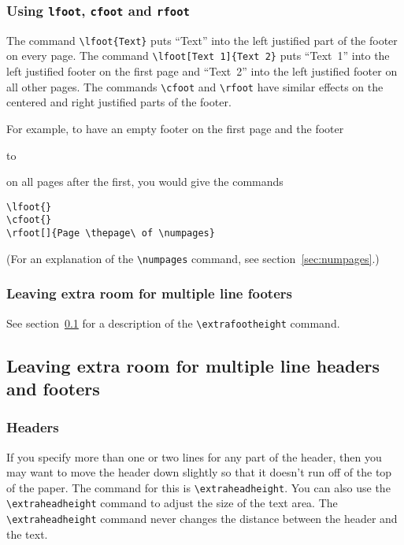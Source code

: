 \documentclass[12pt]{exam}
\def\samplefoot#1#2#3#4{%
  \begin{trivlist}
     \item[]
     \leavevmode
     #1
     \vskip 3pt

     \hbox to \textwidth{%
         \rlap{\parbox[t]{\textwidth}{\raggedright#2}}%
         \hfil\parbox[t]{\textwidth}{\centering#3}\hfil
         \llap{\parbox[t]{\textwidth}{\raggedleft#4}}%
  }%
  \end{trivlist}
}
\begin{document}
\subsubsection{Using \texttt{lfoot}, \texttt{cfoot} and \texttt{rfoot}}
\label{sec:lfoot}

The command \verb"\lfoot{Text}" puts ``Text'' into the left justified
part of the footer on every page.  The command
\verb"\lfoot[Text 1]{Text 2}" puts ``Text~1'' into the left justified
footer on the first page and ``Text~2'' into the left justified footer
on all other pages.  The commands \verb"\cfoot" and \verb"\rfoot" have
similar effects on the centered and right justified parts of the
footer. 


For example, to have an empty footer on the first page and the footer
\samplefoot{}{}{Page 3 of 5}{}
on all pages after the first, you would give the commands
%
\begin{verbatim}
\lfoot{}
\cfoot{}
\rfoot[]{Page \thepage\ of \numpages}
\end{verbatim}
%
(For an explanation of the \verb"\numpages" command, see
section~\ref{sec:numpages}.)  



\subsubsection*{Leaving extra room for multiple line footers}

See section~\ref{sec:extra-room} for a description of the
\verb"\extrafootheight" command.




\subsection{Leaving extra room for multiple line headers and footers}
\label{sec:extra-room}

\subsubsection*{Headers}
If you specify more than one or two lines for any part of the header,
then you may want to move the header down slightly so that it doesn't
run off of the top of the paper.  The command for this is
\verb"\extraheadheight".  You can also use the \verb"\extraheadheight"
command to adjust the size of the text area.  The
\verb"\extraheadheight" command never changes the distance between the
header and the text.
\end{document}
